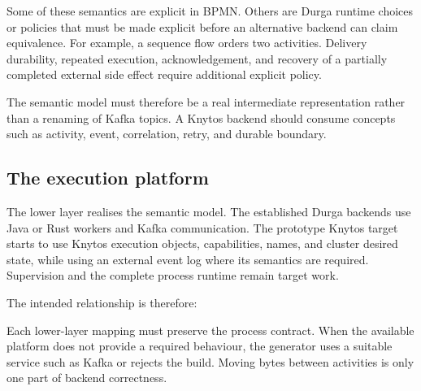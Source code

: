 Some of these semantics are explicit in BPMN. Others are Durga runtime choices
or policies that must be made explicit before an alternative backend can claim
equivalence. For example, a sequence flow orders two activities. Delivery
durability, repeated execution, acknowledgement, and recovery of a partially
completed external side effect require additional explicit policy.

The semantic model must therefore be a real intermediate representation rather
than a renaming of Kafka topics. A Knytos backend should consume concepts
such as activity, event, correlation, retry, and durable boundary.

\subsection{The execution platform}

The lower layer realises the semantic model. The established Durga backends use
Java or Rust workers and Kafka communication. The prototype Knytos target
starts to use Knytos execution objects, capabilities, names, and cluster
desired state, while using an external event log where its semantics are
required. Supervision and the complete process runtime remain target work.

The intended relationship is therefore:

\begin{center}
\end{center}

Each lower-layer mapping must preserve the process contract. When the available
platform does not provide a required behaviour, the generator uses a suitable service
such as Kafka or rejects the build. Moving bytes between activities is only one
part of backend correctness.


